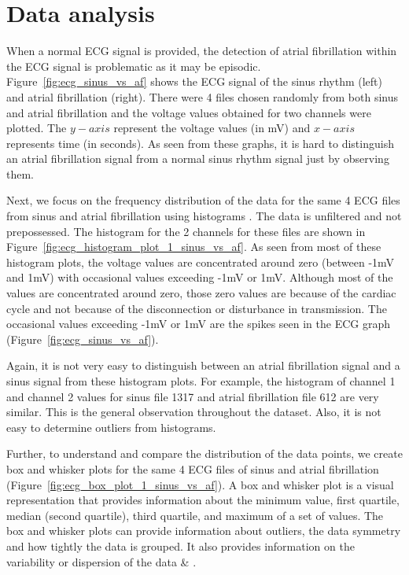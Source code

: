 \clearpage

\section{Data analysis}
\label{sec:data_analysis}

When a normal ECG signal is provided, the detection of atrial fibrillation within the ECG signal is problematic as it may be episodic. Figure~\ref{fig:ecg_sinus_vs_af} shows the ECG signal of the sinus rhythm (left) and atrial fibrillation (right). There were 4 files chosen randomly from both sinus and atrial fibrillation and the voltage values obtained for two channels were plotted. The $y-axis$ represent the voltage values (in mV) and $x-axis$ represents time (in seconds). As seen from these graphs, it is hard to distinguish an atrial fibrillation signal from a normal sinus rhythm signal just by observing them.

Next, we focus on the frequency distribution of the data for the same 4 ECG files from sinus and atrial fibrillation using histograms \cite{scott1979optimal}. The data is unfiltered and not prepossessed. The histogram for the 2 channels for these files are shown in Figure~\ref{fig:ecg_histogram_plot_1_sinus_vs_af}. As seen from most of these histogram plots, the voltage values are concentrated around zero (between -1mV and 1mV) with occasional values exceeding -1mV or 1mV. Although most of the values are concentrated around zero, those zero values are because of the cardiac cycle and not because of the disconnection or disturbance in transmission. The occasional values exceeding -1mV or 1mV are the spikes seen in the ECG graph (Figure~\ref{fig:ecg_sinus_vs_af}). 

Again, it is not very easy to distinguish between an atrial fibrillation signal and a sinus signal from these histogram plots. For example, the histogram of channel 1 and channel 2 values for sinus file 1317 and atrial fibrillation file 612 are very similar. This is the general observation throughout the dataset. Also, it is not easy to determine outliers from histograms.

Further, to understand and compare the distribution of the data points, we create box and whisker plots for the same 4 ECG files of sinus and atrial fibrillation (Figure~\ref{fig:ecg_box_plot_1_sinus_vs_af}). A box and whisker plot is a visual representation that provides information about the minimum value, first quartile, median (second quartile), third quartile, and maximum of a set of values. The box and whisker plots can provide information about outliers, the data symmetry and how tightly the data is grouped. It also provides information on the variability or dispersion of the data \cite{mcgill1978variations} \& \cite{krzywinski2014points}. 

